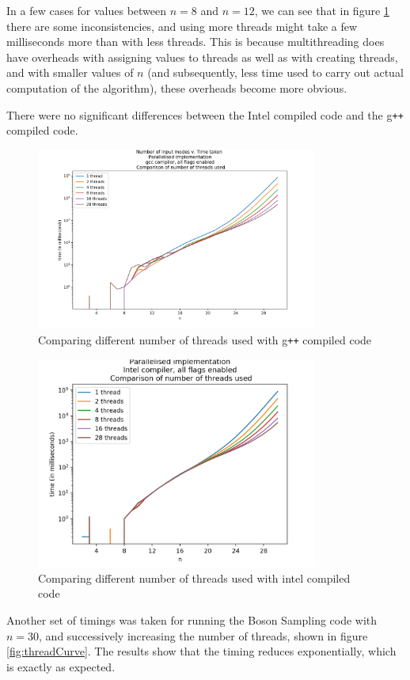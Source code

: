 \documentclass[ %
                    author={Manan Vaswani},
                supervisor={Dr. Raphael Clifford},
                    degree={MEng},
                     title={A multi-core CPU implementation of the classical Boson Sampling algorithm},
                  subtitle={},
                      type={},
                      year={2019} ]{dissertation}
\theoremstyle{plain}
\theoremstyle{definition}
\begin{document}
In a few cases for values between $n=8$ and $n=12$, we can see that in figure \ref{fig:gcc_threads} there are some inconsistencies, and using more threads might take a few milliseconds more than with less threads. This is because multithreading does have overheads with assigning values to threads as well as with creating threads, and with smaller values of $n$ (and subsequently, less time used to carry out actual computation of the algorithm), these overheads become more obvious. 

There were no significant differences between the Intel compiled code and the g\texttt{++} compiled code.
\begin{figure}
	\centering
  \includegraphics[width=25em]{Graphs/gcc_threads_log.png}
  \caption{Comparing different number of threads used with g\texttt{++} compiled code}
  \label{fig:gcc_threads}
\end{figure}

\begin{figure}
	\centering
  \includegraphics[width=25em]{Graphs/intel_threads_log.png}
  \caption{Comparing different number of threads used with intel compiled code}
  \label{fig:intel_threads}
\end{figure}

Another set of timings was taken for running the Boson Sampling code with $n=30$, and successively increasing the number of threads, shown in figure \ref{fig:threadCurve}. The results show that the timing reduces exponentially, which is exactly as expected.
\end{document}
